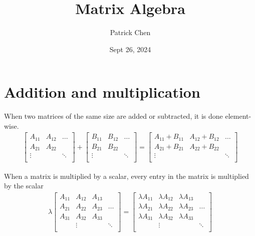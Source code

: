\documentclass{article}
\title{Matrix Algebra}
\author{Patrick Chen}
\date{Sept 26, 2024}
\theoremstyle{mytheoremstyle}
\theoremstyle{mytheoremstyle}
\theoremstyle{myproblemstyle}
\begin{document}
    \maketitle
    \section*{Addition and multiplication}
    When two matrices of the same size are added or subtracted, it is done
    element-wise.
    \begin{align*}
        \begin{bmatrix}
            A_{11} & A_{12} & \dots \\
            A_{21} & A_{22} & \\
            \vdots &        & \ddots \\
        \end{bmatrix} +
        \begin{bmatrix}
            B_{11} & B_{12} & \dots \\
            B_{21} & B_{22} & \\
            \vdots &        & \ddots \\
        \end{bmatrix} =
        \begin{bmatrix}
            A_{11}+B_{11} & A_{12}+B_{12} & \dots \\
            A_{21}+B_{21} & A_{22}+B_{22} & \\
            \vdots        &               & \ddots \\
        \end{bmatrix}
    \end{align*}

    When a matrix is multiplied by a scalar, every entry in the matrix is
    multiplied by the scalar
    \begin{align*}
        \lambda \begin{bmatrix}
            A_{11} & A_{12} & A_{13} & \\
            A_{21} & A_{22} & A_{23} & \dots \\
            A_{31} & A_{32} & A_{33} & \\
                   & \vdots &        & \ddots \\
        \end{bmatrix} =
        \begin{bmatrix}
            \lambda A_{11} & \lambda A_{12} & \lambda A_{13} & \\
            \lambda A_{21} & \lambda A_{22} & \lambda A_{23} & \dots \\
            \lambda A_{31} & \lambda A_{32} & \lambda A_{33} & \\
                   & \vdots &        & \ddots \\
        \end{bmatrix}
    \end{align*}
\end{document}
